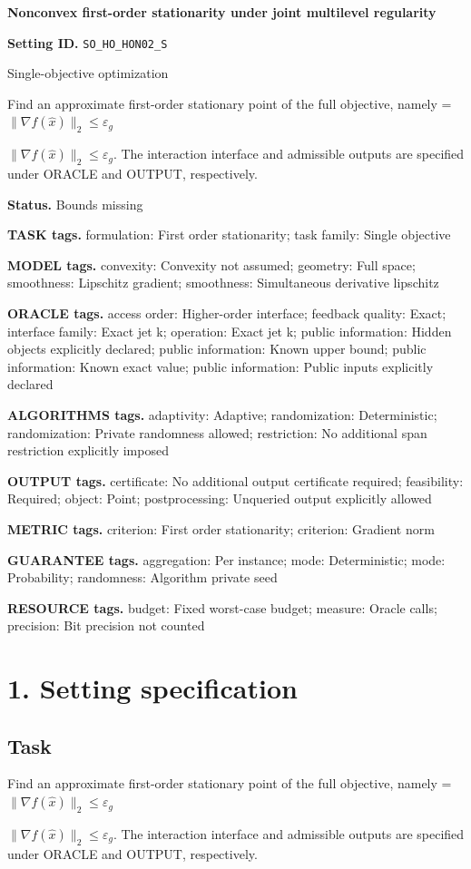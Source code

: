 \documentclass[10pt,a4paper]{article}
\newcommand{\AtlasMath}[1]{\par\begingroup\centering\setbox0=\hbox{$\displaystyle #1$}\ifdim\wd0>1.4\linewidth\typeout{ATLAS WIDE FORMULA: \the\wd0}\fi\ifdim\wd0>\linewidth\resizebox{\linewidth}{!}{\box0}\else\box0\fi\par\endgroup}
\newcommand{\AtlasInlineMath}[1]{\begingroup\setbox0=\hbox{$#1$}\ifdim\wd0>.4\linewidth\endgroup\AtlasMath{#1}\else\endgroup$#1$\fi}
\begin{document}
\raggedright

{\LARGE\bfseries\sffamily\color{AtlasNavy} Nonconvex first-order stationarity under joint multilevel regularity\par}\vspace{5pt}
\textbf{Setting ID.} \texttt{SO\_\allowbreak{}HO\_\allowbreak{}HON02\_\allowbreak{}S}

Single-objective optimization

Find an approximate first-order stationary point of the full objective, namely \AtlasInlineMath{\|\nabla f(\widehat{x})\|_2\le\varepsilon_g}. The interaction interface and admissible outputs are specified under ORACLE and OUTPUT, respectively.

\textbf{Status.} Bounds missing

\textbf{TASK tags.} formulation: First order stationarity; task family: Single objective

\textbf{MODEL tags.} convexity: Convexity not assumed; geometry: Full space; smoothness: Lipschitz gradient; smoothness: Simultaneous derivative lipschitz

\textbf{ORACLE tags.} access order: Higher-order interface; feedback quality: Exact; interface family: Exact jet k; operation: Exact jet k; public information: Hidden objects explicitly declared; public information: Known upper bound; public information: Known exact value; public information: Public inputs explicitly declared

\textbf{ALGORITHMS tags.} adaptivity: Adaptive; randomization: Deterministic; randomization: Private randomness allowed; restriction: No additional span restriction explicitly imposed

\textbf{OUTPUT tags.} certificate: No additional output certificate required; feasibility: Required; object: Point; postprocessing: Unqueried output explicitly allowed

\textbf{METRIC tags.} criterion: First order stationarity; criterion: Gradient norm

\textbf{GUARANTEE tags.} aggregation: Per instance; mode: Deterministic; mode: Probability; randomness: Algorithm private seed

\textbf{RESOURCE tags.} budget: Fixed worst-case budget; measure: Oracle calls; precision: Bit precision not counted

\section{1. Setting specification}
\subsection{Task}
Find an approximate first-order stationary point of the full objective, namely \AtlasInlineMath{\|\nabla f(\widehat{x})\|_2\le\varepsilon_g}. The interaction interface and admissible outputs are specified under ORACLE and OUTPUT, respectively.
\end{document}
